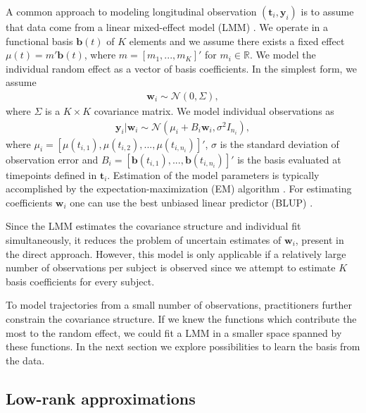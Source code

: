 \documentclass[preprint]{imsart}
\numberwithin{equation}{section}
\theoremstyle{plain}
\newcommand{\cN}{\mathcal{N}}
\newcommand{\R}{\mathbb{R}}
\newcommand{\bt}{\mathbf{t}}
\newcommand{\bb}{\mathbf{b}}
\newcommand{\bw}{\mathbf{w}}
\begin{document}
A common approach to modeling longitudinal observation $(\mathbf{t}_i, \mathbf{y}_i)$ is to assume that data come from a linear mixed-effect model (LMM) \citep{verbeke1997linear, zeger1988models}. We operate in a functional basis $\bb(t)$ of $K$ elements and we assume there exists a fixed effect $\mu(t) = m' \bb(t)$, where $m = [m_1,...,m_K]'$ for $m_i \in \R$. We model the individual random effect as a vector of basis coefficients. In the simplest form, we assume
\begin{align}\label{eq:latent-probabilistic}
 \mathbf{w}_i \sim \cN(0, \Sigma),
\end{align}
where $\Sigma$ is a $K \times K$ covariance matrix. We model individual observations as
\begin{align}\label{eq:probabilistic}
 \mathbf{y}_i|\mathbf{w}_i \sim \cN(\mu_i + B_i\mathbf{w}_i, \sigma^2I_{n_i}),
\end{align}
where $\mu_i = [\mu(t_{i,1}),\mu(t_{i,2}),...,\mu(t_{i,n_i})]'$, $\sigma$ is the standard deviation of observation error and $B_i = [\bb(t_{i,1}),...,\bb(t_{i,n_i})]'$ is the basis evaluated at timepoints defined in $\bt_i$. Estimation of the model parameters is typically accomplished by the expectation-maximization (EM) algorithm \citep{laird1982random}. For estimating coefficients $\bw_i$ one can use the best unbiased linear predictor (BLUP) \citep{henderson1950estimation,robinson1991blup}. %

Since the LMM estimates the covariance structure and individual fit simultaneously, it reduces the problem of uncertain estimates of $\bw_i$, present in the direct approach. However, this model is only applicable if a relatively large number of observations per subject is observed since we attempt to estimate $K$ basis coefficients for every subject.

To model trajectories from a small number of observations, practitioners further constrain the covariance structure. If we knew the functions which contribute the most to the random effect, we could fit a LMM in a smaller space spanned by these functions. In the next section we explore possibilities to learn the basis from the data. %

\subsection{Low-rank approximations}\label{ss:reduced-rank}
\end{document}
